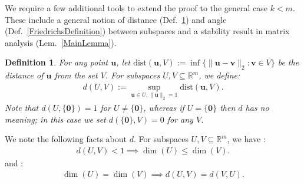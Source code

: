 \documentclass[9pt,twocolumn]{pnas-new}
\newtheorem{lemma}{Lemma}
\newtheorem{definition}{Definition}
\newtheorem{remark}{Remark}
\begin{document}


We require a few additional tools to extend the proof to the general case $k < m$. These include a general notion of distance (Def.~\ref{dDef}) and angle (Def.~\ref{FriedrichsDefinition}) between subspaces and a stability result in matrix analysis (Lem.~\ref{MainLemma}).

\begin{definition}\label{dDef}
For any point $\mathbf{u}$, let $\text{dist}(\mathbf{u}, V) := \inf \{\| \mathbf{u}-\mathbf{v} \|_2: \mathbf{v} \in V\}$ be the distance of $\mathbf{u}$ from the set $V$. For subspaces $U,V \subseteq \mathbb{R}^m$, we define: %
\begin{align}\label{d}
d(U,V) := \sup_{\mathbf{u} \in U, \|\mathbf{u}\|_2 = 1} \text{dist}(\mathbf{u},V).
\end{align}
Note that $d(U,\{\textbf{0}\}) = 1$ for $U \neq \{\mathbf{0}\}$, whereas if $U = \{\textbf{0}\}$ then $d$ has no meaning; in this case we set $d(\{\textbf{0}\},V) = 0$ for any $V$.
\end{definition}

We note the following facts about $d$. For subspaces $U,V \subseteq \mathbb{R}^m$, we have \cite[Cor.~2.6]{Kato2013}:
\begin{align}\label{dimLem}
d(U,V) < 1 \implies \dim(U) \leq \dim(V).
\end{align}
%
and \cite[Lem.~3.2]{Morris10}:
\begin{align}\label{eqdim}
\dim(U) = \dim(V) \implies d(U,V) = d(V,U).
\end{align}

\end{document}

